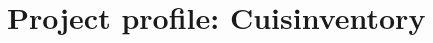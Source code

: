 \documentclass{article} %
\begin{document}
\section*{Project profile: Cuisinventory}
\end{document}
